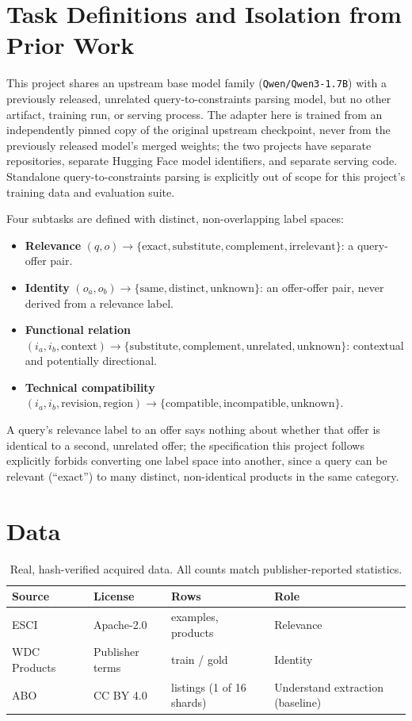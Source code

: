 \documentclass{article}
\newcommand{\code}[1]{\texttt{#1}}
\begin{document}
\section{Task Definitions and Isolation from Prior Work}
\label{sec:isolation}
This project shares an upstream base model family (\code{Qwen/Qwen3-1.7B}) with a previously released, unrelated query-to-constraints parsing model, but no other artifact, training run, or serving process. The adapter here is trained from an independently pinned copy of the original upstream checkpoint, never from the previously released model's merged weights; the two projects have separate repositories, separate Hugging Face model identifiers, and separate serving code. Standalone query-to-constraints parsing is explicitly out of scope for this project's training data and evaluation suite.

Four subtasks are defined with distinct, non-overlapping label spaces:
\begin{itemize}
\item \textbf{Relevance} $(q, o) \to \{\text{exact}, \text{substitute}, \text{complement}, \text{irrelevant}\}$: a query-offer pair.
\item \textbf{Identity} $(o_a, o_b) \to \{\text{same}, \text{distinct}, \text{unknown}\}$: an offer-offer pair, never derived from a relevance label.
\item \textbf{Functional relation} $(i_a, i_b, \text{context}) \to \{\text{substitute}, \text{complement}, \text{unrelated}, \text{unknown}\}$: contextual and potentially directional.
\item \textbf{Technical compatibility} $(i_a, i_b, \text{revision}, \text{region}) \to \{\text{compatible}, \text{incompatible}, \text{unknown}\}$.
\end{itemize}
A query's relevance label to an offer says nothing about whether that offer is identical to a second, unrelated offer; the specification this project follows explicitly forbids converting one label space into another, since a query can be relevant (``exact'') to many distinct, non-identical products in the same category.

\section{Data}
\label{sec:data}
\begin{table}[t]
\centering
\caption{Real, hash-verified acquired data. All counts match publisher-reported statistics.}
\label{tab:data}
\begin{tabularx}{\textwidth}{lXX X}
\toprule
Source & License & Rows & Role \\
\midrule
ESCI~\cite{esci} & Apache-2.0 & \EsciExamples{} examples, \EsciProducts{} products & Relevance \\
WDC Products~\cite{wdcproducts} & Publisher terms & \WdcTrainPairs{} train / \WdcGoldPairs{} gold & Identity \\
ABO~\cite{abo} & CC BY 4.0 & \AboListings{} listings (1 of 16 shards) & Understand extraction (baseline) \\
\bottomrule
\end{tabularx}
\end{table}
\end{document}

